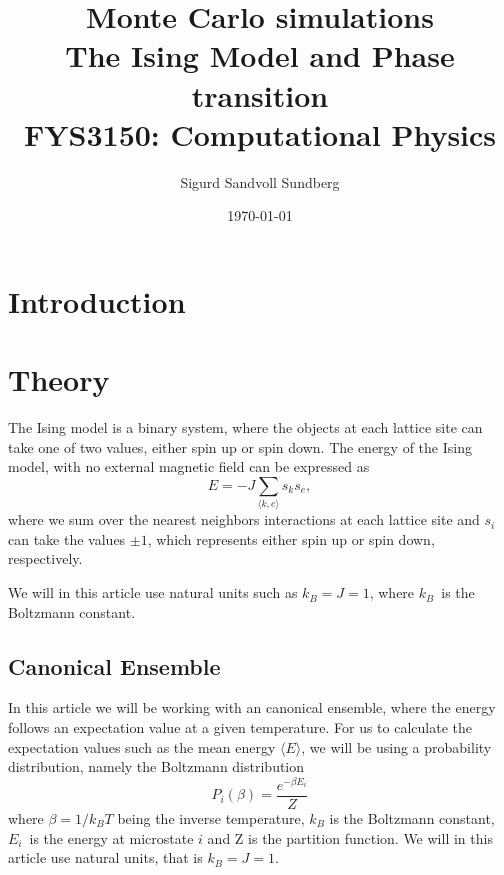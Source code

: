 \documentclass[%
reprint,
nofootinbib,
amsmath,amssymb,
aps,
]{revtex4-1}
\begin{document}
	
\title{Monte Carlo simulations\\
	\normalsize{The Ising Model and Phase transition} \\
	\hrulefill\small{ FYS3150: Computational Physics }\hrulefill}

\author{Sigurd Sandvoll Sundberg}

%

\date{\today}

\begin{abstract}%

\end{abstract}

\maketitle 

\section{Introduction} %

\section{Theory} %
The Ising model is a binary system, where the objects at each lattice site can take one of two values, either spin up or spin down. 
The energy of the Ising model, with no external magnetic field can be expressed as 
\begin{equation}
	E = -J\sum_{\langle k,e \rangle} s_ks_e,
\end{equation}
where we sum over the nearest neighbors interactions at each lattice site and $s_i$ can take the values $\pm 1$, which represents either spin up or spin down, respectively. 

We will in this article use natural units such as $k_B = J = 1$, where $k_B$ is the Boltzmann constant. 
\subsection{Canonical Ensemble} %
In this article we will be working with an canonical ensemble, where the energy follows an expectation value at a given temperature. For us to calculate the expectation values such as the mean energy $\langle E \rangle$, we will be using a probability distribution, namely the Boltzmann distribution
\begin{equation}\label{eq:boltz}
	P_i(\beta) = \frac{e^{-\beta E_i}}{Z}
\end{equation}
where $\beta = 1/k_BT$ being the inverse temperature, $k_B$ is the Boltzmann constant, $E_i$ is the energy at microstate $i$ and Z is the partition function. We will in this article use natural units, that is $k_B = J = 1$. 
\end{document}
